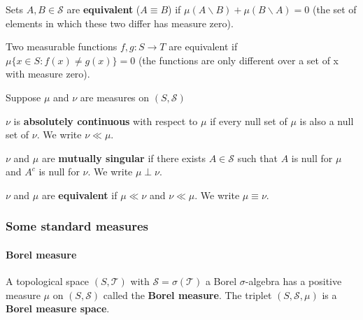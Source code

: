 \begin{definition}
Sets $A, B \in \mathscr{S}$ are \textbf{equivalent} ($A \equiv B$) if $\mu(A \backslash B) + \mu(B \backslash A) = 0$ (the set of elements in which these two differ has measure zero).

Two measurable functions $f, g : S \to T$ are equivalent if $\mu\{x \in S : f(x) \neq g(x)\} = 0$ (the functions are only different over a set of x with measure zero).
\end{definition}

\begin{definition}
Suppose $\mu$ and $\nu$ are measures on $(S, \mathscr{S})$
\begin{compactenum}[a.]
\item $\nu$ is \textbf{absolutely continuous} with respect to $\mu$ if every null set of $\mu$ is also a null set of $\nu$. We write $\nu \ll \mu$.
\item $\nu$ and $\mu$ are \textbf{mutually singular} if there exists $A \in \mathscr{S}$ such that $A$ is null for $\mu$ and $A^c$ is null for $\nu$. We write $\mu \perp \nu$.
\item $\nu$ and $\mu$ are \textbf{equivalent} if $\mu \ll \nu$ and $\nu \ll \mu$. We write $\mu \equiv \nu$.
\end{compactenum}
\end{definition}

\subsubsection{Some standard measures}

\paragraph{Borel measure}

\begin{definition}
A topological space $(S, \mathscr{T})$ with $\mathscr{S} = \sigma(\mathscr{T})$ a Borel $\sigma$-algebra has a positive measure $\mu$ on $(S, \mathscr{S})$ called the \textbf{Borel measure}. The triplet $(S, \mathscr{S}, \mu)$ is a \textbf{Borel measure space}.
\end{definition}

